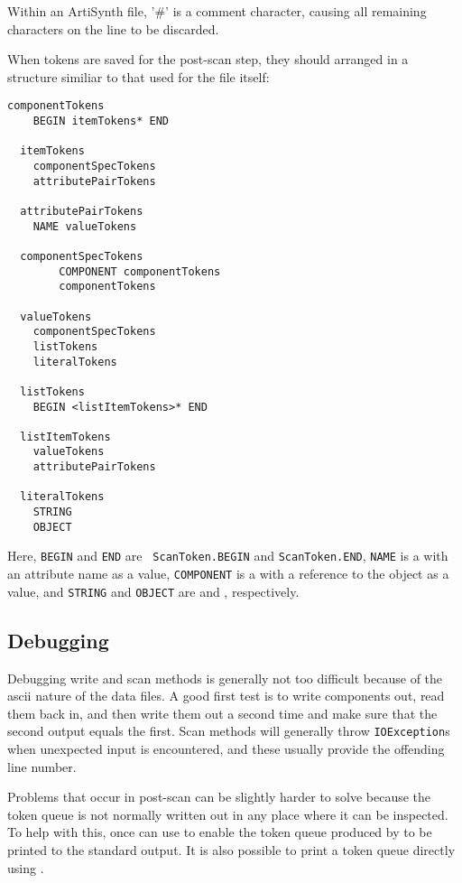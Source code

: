 \documentclass{article}
\begin{document}
Within an ArtiSynth file, '\#' is a comment character, causing all
remaining characters on the line to be discarded.

When tokens are saved for the post-scan step, they 
should arranged in a structure similiar to that used
for the file itself:
\begin{lstlisting}[]
  componentTokens
	BEGIN itemTokens* END

  itemTokens
	componentSpecTokens
	attributePairTokens

  attributePairTokens
	NAME valueTokens

  componentSpecTokens
        COMPONENT componentTokens
        componentTokens

  valueTokens
	componentSpecTokens
	listTokens
	literalTokens

  listTokens
	BEGIN <listItemTokens>* END

  listItemTokens
	valueTokens
	attributePairTokens

  literalTokens
	STRING
	OBJECT
\end{lstlisting}
Here, {\tt BEGIN} and {\tt END} are {\tt
ScanToken.BEGIN} and {\tt ScanToken.END}, {\tt NAME} is a
 with an attribute name as
a value, {\tt COMPONENT} is a
 with a reference to the
object as a value, and {\tt STRING} and {\tt OBJECT} are
 and
, respectively.

\subsection{Debugging}

Debugging write and scan methods is generally not too difficult
because of the ascii nature of the data files. A good first test is to
write components out, read them back in, and then write them out a
second time and make sure that the second output equals the
first. Scan methods will generally throw {\tt IOException}s when
unexpected input is encountered, and these usually provide the
offending line number. 

Problems that occur in post-scan can be slightly harder to solve
because the token queue is not normally written out in any place where it can
be inspected. To help with this, once can use
to enable the token queue produced by
 to be
printed to the standard output. It is also possible to print a token
queue directly using 
.
\end{document}
